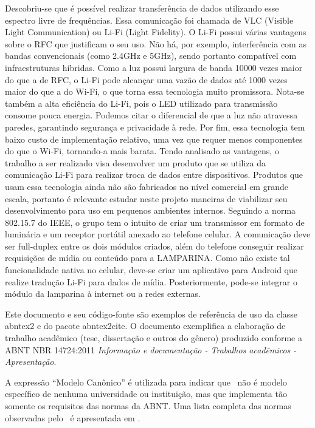 \documentclass[
12pt,				%
openright,			%
twoside,			%
a4paper,			%
hyphens,
english,			%
french,				%
spanish,			%
brazil				%
]{abntex2}
\begin{document}
		 Descobriu-se que é possível realizar transferência de dados utilizando esse espectro livre de frequências. Essa comunicação foi chamada de VLC (Visible Light Communication) ou Li-Fi (Light Fidelity). O Li-Fi possui várias vantagens sobre o RFC que justificam o seu uso. Não há, por exemplo, interferência com as bandas convencionais (como 2.4GHz e 5GHz), sendo portanto compatível com infraestruturas híbridas. Como a luz possui largura de banda 10000 vezes maior do que a de RFC, o Li-Fi pode alcançar uma vazão de dados até 1000 vezes maior do que a do Wi-Fi, o que torna essa tecnologia muito promissora. Nota-se também a alta eficiência do Li-Fi, pois o LED utilizado para transmissão consome pouca energia. Podemos citar o diferencial de que a luz não atravessa paredes, garantindo segurança e privacidade à rede. Por fim, essa tecnologia tem baixo custo de implementação relativo, uma vez que requer menos componentes do que o Wi-Fi, tornando-a mais barata.
		 Tendo analisado as vantagens, o trabalho a ser realizado visa desenvolver um produto que se utiliza da comunicação Li-Fi para realizar troca de dados entre dispositivos. Produtos que usam essa tecnologia ainda não são fabricados no nível comercial em grande escala, portanto é relevante estudar neste projeto maneiras de viabilizar seu desenvolvimento para uso em pequenos ambientes internos. Seguindo a norma 802.15.7 do IEEE, o grupo tem o intuito de criar um transmissor em formato de luminária e um receptor portátil anexado ao telefone celular. A comunicação deve ser full-duplex entre os dois módulos criados, além do telefone conseguir realizar requisições de mídia ou conteúdo para a LAMPARINA. Como não existe tal funcionalidade nativa no celular, deve-se criar um aplicativo para Android que realize tradução Li-Fi para dados de mídia. Posteriormente, pode-se integrar o módulo da lamparina à internet ou a redes externas.
		 
		Este documento e seu código-fonte são exemplos de referência de uso da classe
		\textsf{abntex2} e do pacote \textsf{abntex2cite}. O documento 
		exemplifica a elaboração de trabalho acadêmico (tese, dissertação e outros do
		gênero) produzido conforme a ABNT NBR 14724:2011 \emph{Informação e documentação
			- Trabalhos acadêmicos - Apresentação}.
		
		A expressão ``Modelo Canônico'' é utilizada para indicar que \abnTeX\ não é
		modelo específico de nenhuma universidade ou instituição, mas que implementa tão
		somente os requisitos das normas da ABNT. Uma lista completa das normas
		observadas pelo \abnTeX\ é apresentada em .
		
\end{document}
